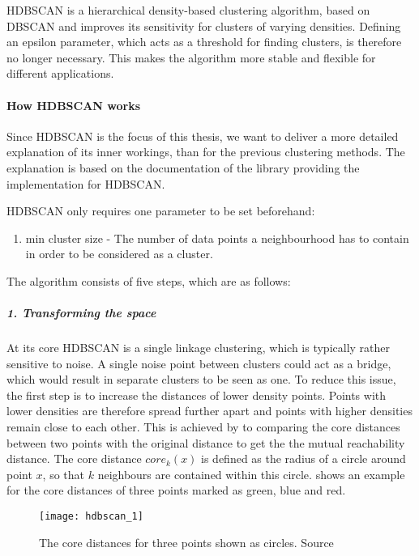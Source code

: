 HDBSCAN is a hierarchical density-based clustering algorithm\cite{McInnes2017},
based on DBSCAN and improves its sensitivity for clusters of varying densities.
Defining an epsilon parameter, which acts as a threshold for finding clusters, is therefore no longer necessary.
This makes the algorithm more stable and flexible for different applications.

\paragraph{How HDBSCAN works}
Since HDBSCAN is the focus of this thesis, we want to deliver a more detailed explanation of its inner workings,
than for the previous clustering methods. 
The explanation is based on the documentation of the library providing the implementation for HDBSCAN\cite{how_hdbscan_works}.

HDBSCAN only requires one parameter to be set beforehand:

\begin{enumerate}
    \item min cluster size - The number of data points a neighbourhood has to contain in order to be considered as a cluster.
\end{enumerate}

The algorithm consists of five steps, which are as follows: 

\subparagraph{1. Transforming the space}
At its core HDBSCAN is a single linkage clustering, which is typically rather sensitive to noise.
A single noise point between clusters could act as a bridge, which would result in separate clusters to be seen as one.
To reduce this issue, the first step is to increase the distances of lower density points. 
Points with lower densities are therefore spread further apart and points with higher densities remain close to each other.
This is achieved by to comparing the core distances between two points with the original distance
to get the the mutual reachability distance.
The core distance $core_k(x)$ is defined as the radius of a circle around point $x$,
so that $k$ neighbours are contained within this circle.
 shows an example for the core distances of three points marked as green, blue and red.

\begin{figure}[h]
    \centering
    \texttt{[image: hdbscan\_1]}
    \caption{
        The core distances for three points shown as circles.
        Source\cite{how_hdbscan_works}
    }
    \label{fig:hdbscan_1}
\end{figure}

